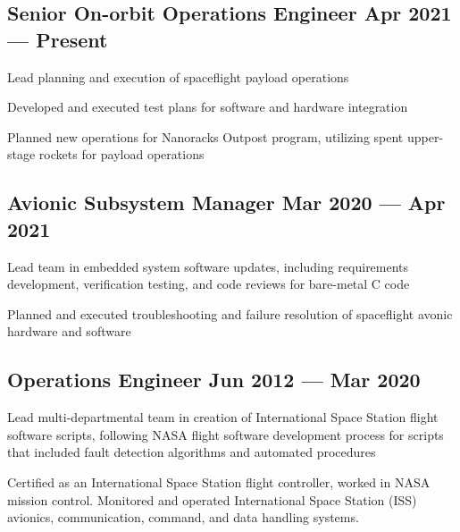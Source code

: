 \documentclass[letter,10pt]{article}
\begin{document}
\subsection{{Senior On-orbit Operations Engineer \hfill Apr 2021 --- Present}}
\begin{zitemize}
\item Lead planning and execution of spaceflight payload operations
\item Developed and executed test plans for software and hardware integration
\item Planned new operations for Nanoracks Outpost program, utilizing spent upper-stage rockets for payload operations
\end{zitemize}

\subsection{{Avionic Subsystem Manager \hfill Mar 2020 --- Apr 2021}}
\begin{zitemize}
\item Lead team in embedded system software updates, including requirements development, verification testing, and code reviews for bare-metal C code
\item Planned and executed troubleshooting and failure resolution of spaceflight avonic hardware and software
\end{zitemize}

\subsection{{Operations Engineer \hfill Jun 2012 --- Mar 2020}}
\begin{zitemize}
\item Lead multi-departmental team in creation of International Space Station flight software scripts, following NASA flight software development process for scripts that included fault detection algorithms and automated procedures
\item Certified as an International Space Station flight controller, worked in NASA mission control.
Monitored and operated International Space Station (ISS) avionics, communication, command, and
data handling systems.
\end{zitemize}
\end{document}
